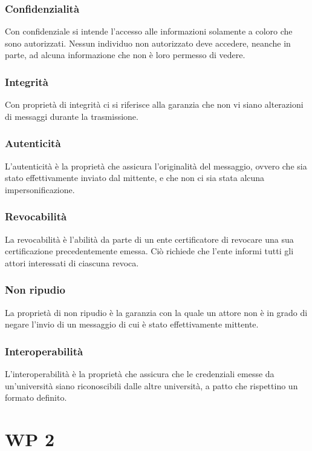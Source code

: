 \documentclass[a4paper,12pt]{article}
\begin{document}
\subsubsection{Confidenzialità}
Con confidenziale si intende l'accesso alle informazioni solamente a coloro che sono autorizzati. Nessun individuo non autorizzato deve accedere, neanche in parte, ad alcuna informazione che non è loro permesso di vedere.
\subsubsection{Integrità}
Con proprietà di integrità ci si riferisce alla garanzia che non vi siano alterazioni di messaggi durante la trasmissione. 
\subsubsection{Autenticità}
L'autenticità è la proprietà che assicura l'originalità del messaggio, ovvero che sia stato effettivamente inviato dal mittente, e che non ci sia stata alcuna impersonificazione.
\subsubsection{Revocabilità}
La revocabilità è l'abilità da parte di un ente certificatore di revocare una sua certificazione precedentemente emessa. Ciò richiede che l'ente informi tutti gli attori interessati di ciascuna revoca.
\subsubsection{Non ripudio}
La proprietà di non ripudio è la garanzia con la quale un attore non è in grado di negare l'invio di un messaggio di cui è stato effettivamente mittente. 
\subsubsection{Interoperabilità}
L'interoperabilità è la proprietà che assicura che le credenziali emesse da un'università siano riconoscibili dalle altre università, a patto che rispettino un formato definito.
\newpage

\section{WP 2}
\end{document}
